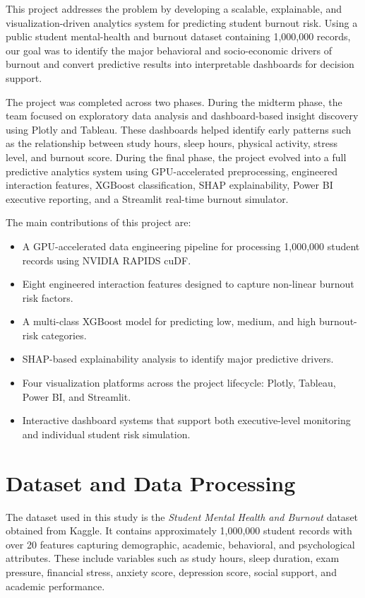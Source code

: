 \documentclass[conference]{IEEEtran}
\begin{document}
This project addresses the problem by developing a scalable, explainable, and visualization-driven analytics system for predicting student burnout risk. Using a public student mental-health and burnout dataset containing 1,000,000 records, our goal was to identify the major behavioral and socio-economic drivers of burnout and convert predictive results into interpretable dashboards for decision support.

The project was completed across two phases. During the midterm phase, the team focused on exploratory data analysis and dashboard-based insight discovery using Plotly and Tableau. These dashboards helped identify early patterns such as the relationship between study hours, sleep hours, physical activity, stress level, and burnout score. During the final phase, the project evolved into a full predictive analytics system using GPU-accelerated preprocessing, engineered interaction features, XGBoost classification, SHAP explainability, Power BI executive reporting, and a Streamlit real-time burnout simulator.

The main contributions of this project are:
\begin{itemize}
    \item A GPU-accelerated data engineering pipeline for processing 1,000,000 student records using NVIDIA RAPIDS cuDF.
    \item Eight engineered interaction features designed to capture non-linear burnout risk factors.
    \item A multi-class XGBoost model for predicting low, medium, and high burnout-risk categories.
    \item SHAP-based explainability analysis to identify major predictive drivers.
    \item Four visualization platforms across the project lifecycle: Plotly, Tableau, Power BI, and Streamlit.
    \item Interactive dashboard systems that support both executive-level monitoring and individual student risk simulation.
\end{itemize}

\section{Dataset and Data Processing}

The dataset used in this study is the \textit{Student Mental Health and Burnout} dataset obtained from Kaggle. It contains approximately 1,000,000 student records with over 20 features capturing demographic, academic, behavioral, and psychological attributes. These include variables such as study hours, sleep duration, exam pressure, financial stress, anxiety score, depression score, social support, and academic performance.
\end{document}
